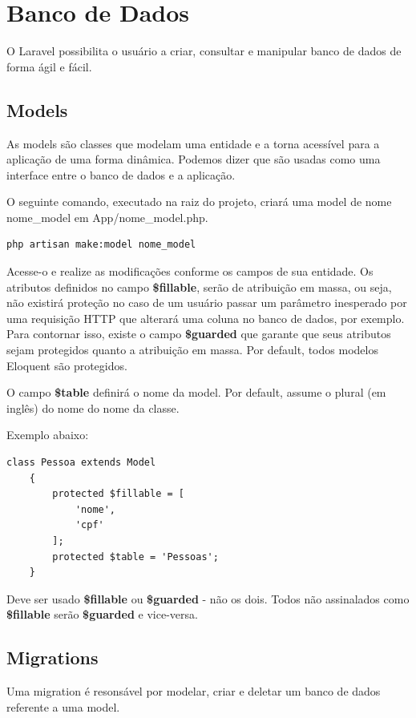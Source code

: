 \documentclass[
12pt,				%
openany,			%
twoside,			%
a4paper,			%
english,			%
french,				%
spanish,			%
brazil,				%
]{abntex2}
\begin{document}
\section{Banco de Dados}
O Laravel possibilita o usuário a criar, consultar e manipular banco de dados de forma ágil e fácil.

\subsection{Models}
As models são classes que modelam uma entidade e a torna acessível para a aplicação de
uma forma dinâmica. Podemos dizer que são usadas como uma interface entre o banco de
dados e a aplicação.

O seguinte comando, executado na raiz do projeto, criará uma model de nome nome\_model
em App/nome\_model.php.

\begin{lstlisting}[style=bash,caption={Criando uma model}]
    php artisan make:model nome_model
\end{lstlisting}


Acesse-o e realize as modificações conforme os campos de sua entidade. Os atributos
definidos no campo \textbf{\$fillable}, serão de atribuição em massa, ou seja, não existirá
proteção no caso de um usuário passar um parâmetro inesperado por uma requisição HTTP
que alterará uma coluna no banco de dados, por exemplo. Para contornar isso, existe o
campo \textbf{\$guarded} que garante que seus atributos sejam protegidos quanto a atribuição em
massa. Por default, todos modelos Eloquent são protegidos.

O campo \textbf{\$table} definirá o nome da model. Por default, assume o plural (em inglês) do
nome do nome da classe.

Exemplo abaixo:

\begin{lstlisting}[style=php,caption={\textit{app/Pessoa.php}}]
    class Pessoa extends Model
    {
        protected $fillable = [
            'nome',
            'cpf'
        ];
        protected $table = 'Pessoas';
    }
\end{lstlisting}

\begin{leftbar}
    Deve ser usado \textbf{\$fillable} ou \textbf{\$guarded }- não os dois. Todos não assinalados como \textbf{\$fillable} serão \textbf{\$guarded} e vice-versa.
\end{leftbar}

\subsection{Migrations}
Uma migration é resonsável por modelar, criar e deletar um banco de dados referente a uma model.
\end{document}
